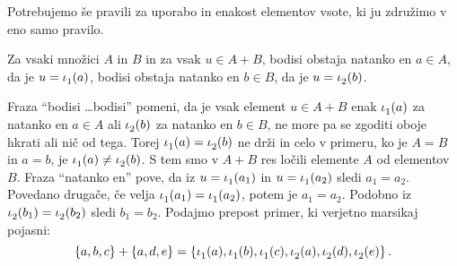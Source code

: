 Potrebujemo še pravili za uporabo in enakost elementov vsote, ki ju združimo v eno samo
pravilo.

\begin{pravilo}
  \label{vsota:uporaba}
  Za vsaki množici $A$ in $B$ in za vsak $u \in A + B$, bodisi obstaja natanko en
  $a \in A$, da je $u = \inl(a)$, bodisi obstaja natanko en $b \in B$, da je
  $u = \inr(b)$.
\end{pravilo}

Fraza ``bodisi \dots bodisi'' pomeni, da je vsak element $u \in A + B$ enak $\inl(a)$
za natanko en $a \in A$ ali $\inr(b)$ za natanko en $b \in B$, ne more pa se zgoditi oboje
hkrati ali nič od tega. Torej $\inl(a) = \inr(b)$ ne drži in celo v primeru, ko je
$A = B$ in $a = b$, je $\inl(a) \neq \inr(b)$. S tem smo v $A + B$ res ločili elemente $A$
od elementov $B$.
%
Fraza ``natanko en'' pove, da iz $u = \inl(a_1)$ in $u = \inl(a_2)$ sledi $a_1 = a_2$.
Povedano drugače, če velja $\inl(a_1) = \inl(a_2)$, potem je $a_1 = a_2$. Podobno iz
$\inr(b_1) = \inr(b_2)$ sledi $b_1 = b_2$.
%
Podajmo prepost primer, ki verjetno marsikaj pojasni:
%
\begin{equation*}
  \set{a, b, c} + \set{a, d, e} =
  \set{\inl(a), \inl(b), \inl(c), \inr(a), \inr(d), \inr(e)}.
\end{equation*}

